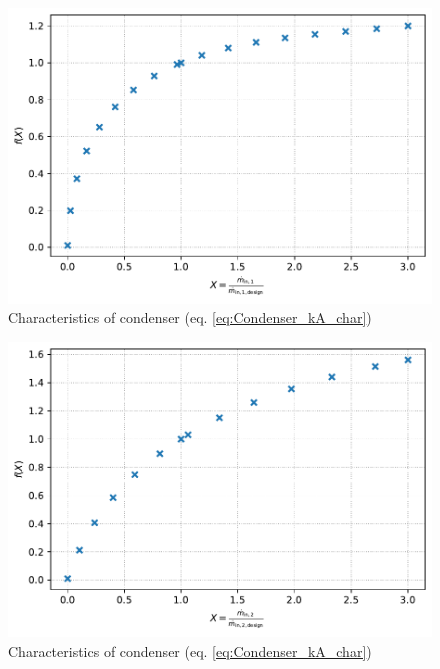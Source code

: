 \begin{minipage}{0.5\textwidth}
\begin{figure}[H]\begin{center}
\includegraphics[width=\textwidth]{figures/Condenser_CharLine_kA_char1_condenser.pdf}
\caption{Characteristics of condenser (eq. \ref{eq:Condenser_kA_char})}
\label{fig:CharLine_kA_char1_condenser}
\end{center}\end{figure}

\end{minipage}
\begin{minipage}{0.5\textwidth}
\begin{figure}[H]\begin{center}
\includegraphics[width=\textwidth]{figures/Condenser_CharLine_kA_char2_condenser.pdf}
\caption{Characteristics of condenser (eq. \ref{eq:Condenser_kA_char})}
\label{fig:CharLine_kA_char2_condenser}
\end{center}\end{figure}

\end{minipage}


